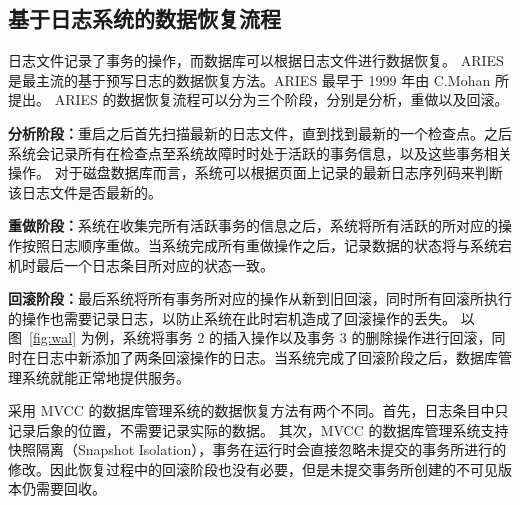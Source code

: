 \subsection{基于日志系统的数据恢复流程}

日志文件记录了事务的操作，而数据库可以根据日志文件进行数据恢复。
ARIES 是最主流的基于预写日志的数据恢复方法。ARIES 最早于 1999 年由 C.Mohan 所提出\cite{mohan_aries_1992}。
ARIES 的数据恢复流程可以分为三个阶段，分别是分析，重做以及回滚。

\textbf{分析阶段：}重启之后首先扫描最新的日志文件，直到找到最新的一个检查点。之后系统会记录所有在检查点至系统故障时时处于活跃的事务信息，以及这些事务相关操作。
对于磁盘数据库而言，系统可以根据页面上记录的最新日志序列码来判断该日志文件是否最新的。

\textbf{重做阶段：}系统在收集完所有活跃事务的信息之后，系统将所有活跃的所对应的操作按照日志顺序重做。当系统完成所有重做操作之后，记录数据的状态将与系统宕机时最后一个日志条目所对应的状态一致。

\textbf{回滚阶段：}最后系统将所有事务所对应的操作从新到旧回滚，同时所有回滚所执行的操作也需要记录日志，以防止系统在此时宕机造成了回滚操作的丢失。
以图~\ref{fig:wal} 为例，系统将事务 2 的插入操作以及事务 3 的删除操作进行回滚，同时在日志中新添加了两条回滚操作的日志。当系统完成了回滚阶段之后，数据库管理系统就能正常地提供服务。

采用 MVCC 的数据库管理系统的数据恢复方法有两个不同。首先，日志条目中只记录后象的位置，不需要记录实际的数据。
其次，MVCC 的数据库管理系统支持快照隔离（Snapshot Isolation），事务在运行时会直接忽略未提交的事务所进行的修改。因此恢复过程中的回滚阶段也没有必要，但是未提交事务所创建的不可见版本仍需要回收。






